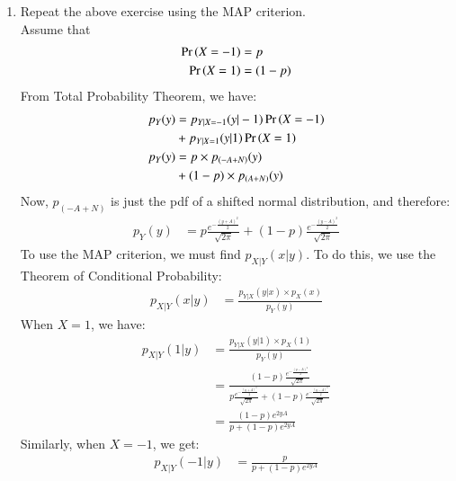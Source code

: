 \documentclass[journal,12pt,twocolumn]{IEEEtran}
\renewcommand\thesection{\arabic{section}}
\begin{document}
\begin{enumerate}[label=\thesection.\arabic*
,ref=\thesection.\theenumi]
\begin{enumerate}[label=\thesection.\arabic*
,ref=\thesection.\theenumi]
\begin{align}
    &= p Q_N(A - \delta) + (1-p)Q_N(A + \delta)
\intertext{Differentiating as before, we get:}
0 &= p \frac{1}{\sqrt{2\pi}} e^{-\frac{(\delta - A)^2}{2}} - (1-p)\frac{1}{\sqrt{2\pi}} e^{-\frac{(A + \delta)^2}{2}} 
\end{align}
 \begin{align}
e^{\frac{{(\delta +A)}^2-{((\delta -A))}^2}{2}}=\frac{1-p}{p}\\
\implies \boxed{\delta=0}
 \end{align}
    \item Repeat the above exercise using the MAP criterion.
\\
\solution
Assume that 
\begin{align}
    \Pr\left(X = -1\right) &= p\\
    \Pr\left(X = 1\right) &= (1-p)
\end{align}
From Total Probability Theorem,
we have:
\begin{align}
\nonumber p_Y(y) &= p_{Y|X = -1}(y|-1) \Pr\left(X = -1\right) \\
&+ p_{Y| X = 1}(y|1) \Pr\left(X = 1\right) \\
p_Y(y) &=  p \times p_{(-A + N)}(y) \\
&+ (1-p) \times p_{(A+N)} (y) 
\end{align}
Now, $p_{(-A + N)}$ is just the pdf of a shifted
normal distribution, and therefore:
\begin{align}
    p_Y(y) &=  p \frac{e^{-\frac{(y+A)^2}{2}}}{\sqrt{2\pi}} + \left(1-p\right) \frac{e^{-\frac{(y-A)^2}{2}}}{\sqrt{2\pi}}
\end{align}
To use the MAP criterion, we must find $p_{X|Y}(x|y)$. To do this, we use the Theorem of Conditional Probability:
\begin{align}
    p_{X|Y}(x|y) &= \frac{p_{Y|X}(y|x) \times p_X(x)}{p_Y(y)}
\end{align}
When $X=1$, we have:
\begin{align}
    p_{X|Y}(1|y) &= \frac{p_{Y|X}(y|1) \times p_X(1)}{p_Y(y)} \\
    &= \frac{\left(1-p\right) \frac{e^{-\frac{(y-A)^2}{2}}}{\sqrt{2\pi}}}{ p \frac{e^{-\frac{(y+A)^2}{2}}}{\sqrt{2\pi}} + \left(1-p\right) \frac{e^{-\frac{(y-A)^2}{2}}}{\sqrt{2\pi}}} \\
    &= \frac{\left(1-p\right) e^{2yA}}{p + \left(1-p\right) e^{2yA}}
\end{align}
Similarly, when $X = -1$, we get:
\begin{align}
    p_{X|Y}(-1|y) &= \frac{p}{p + \left(1-p\right) e^{2yA}} 
\end{align}

\end{enumerate}
\end{enumerate}
\end{document}
